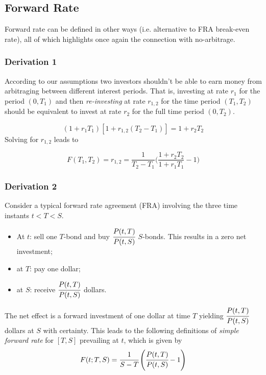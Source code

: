 \documentclass[12pt,a4paper]{book}
\begin{document}
\subsection{Forward Rate}
Forward rate can be defined in other ways (i.e. alternative to FRA break-even rate), all of which highlights once again the connection with no-arbitrage.

\subsubsection{Derivation 1}
According to our assumptions two investors shouldn't be able to earn money from arbitraging between different interest periods. 
That is, investing at rate $r_1$ for the period $(0, T_1)$ and then \emph{re-investing} at rate $r_{1,2}$ for the time period $(T_1, T_2)$ should be equivalent to invest at rate $r_2$ for the full time period $(0, T_2)$. 

\begin{equation}
	(1+r_1 T_1)[1+r_{1,2}(T_2 - T_1)] = 1 + r_2 T_2
	\label{eq:no_arbitrage_r}
\end{equation}
Solving for $r_{1,2}$ leads to

\begin{equation}
	F(T_1, T_2) = r_{1,2} = \frac{1}{T_2 - T_1}\Big(\frac{1+r_2 T_2}{1+r_1 T_1} - 1 \Big)
\end{equation}

\subsubsection{Derivation 2}
Consider a typical forward rate agreement (FRA) involving the three time instants $t < T < S$.
\begin{itemize}
\item At $t$: sell one $T$-bond and buy $\cfrac{P(t,T)}{P(t,S)}$ $S$-bonds. This results in a zero net investment;
\item at $T$: pay one dollar;
\item at $S$: receive $\cfrac{P(t,T)}{P(t,S)}$ dollars.
\end{itemize}

The net effect is a forward investment of one dollar at time $T$ yielding $\cfrac{P(t,T)}{P(t,S)}$ dollars at $S$ with certainty.
This leads to the following definitions of \emph{simple forward rate} for $[T,S]$ prevailing at $t$, which is given by
\begin{equation}
F(t; T,S) = \cfrac{1}{S - T}\left(\cfrac{P(t,T)}{P(t,S)} - 1\right)
\end{equation}
\end{document}

